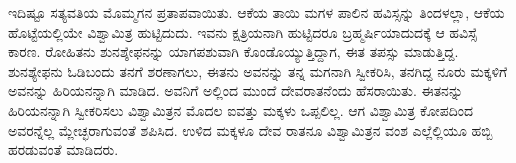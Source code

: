 ಇದಿಷ್ಟೂ ಸತ್ಯವತಿಯ ಮೊಮ್ಮಗನ ಪ್ರತಾಪವಾಯಿತು. ಆಕೆಯ ತಾಯಿ ಮಗಳ ಪಾಲಿನ ಹವಿಸ್ಸನ್ನು ತಿಂದಳಲ್ಲಾ, ಆಕೆಯ ಹೊಟ್ಟೆಯಲ್ಲಿಯೇ ವಿಶ್ವಾಮಿತ್ರ ಹುಟ್ಟಿದುದು. ಇವನು ಕ್ಷತ್ರಿಯನಾಗಿ ಹುಟ್ಟಿದರೂ ಬ್ರಹ್ಮರ್ಷಿಯಾದುದಕ್ಕೆ ಆ ಹವಿಸ್ಸೆ ಕಾರಣ. ರೋಹಿತನು ಶುನಶ್ಶೇಫನನ್ನು ಯಾಗಪಶುವಾಗಿ ಕೊಂಡೊಯ್ಯುತ್ತಿದ್ದಾಗ, ಈತ ತಪಸ್ಸು ಮಾಡುತ್ತಿದ್ದ. ಶುನಶ್ಯೇಫನು ಓಡಿಬಂದು ತನಗೆ ಶರಣಾಗಲು, ಈತನು ಅವನನ್ನು ತನ್ನ ಮಗನಾಗಿ ಸ್ವೀಕರಿಸಿ, ತನಗಿದ್ದ ನೂರು ಮಕ್ಕಳಿಗೆ ಅವನನ್ನು ಹಿರಿಯನನ್ನಾಗಿ ಮಾಡಿದ. ಅವನಿಗೆ ಅಲ್ಲಿಂದ ಮುಂದೆ ದೇವರಾತನೆಂದು ಹೆಸರಾಯಿತು. ಈತನನ್ನು ಹಿರಿಯನನ್ನಾಗಿ ಸ್ವೀಕರಿಸಲು ವಿಶ್ವಾಮಿತ್ರನ ಮೊದಲ ಐವತ್ತು ಮಕ್ಕಳು ಒಪ್ಪಲಿಲ್ಲ. ಆಗ ವಿಶ್ವಾಮಿತ್ರ ಕೋಪದಿಂದ ಅವರನ್ನೆಲ್ಲ ಮ್ಲೇಚ್ಛರಾಗುವಂತೆ ಶಪಿಸಿದ. ಉಳಿದ ಮಕ್ಕಳೂ ದೇವ ರಾತನೂ ವಿಶ್ವಾಮಿತ್ರನ ವಂಶ ಎಲ್ಲೆಲ್ಲಿಯೂ ಹಬ್ಬಿ ಹರಡುವಂತೆ ಮಾಡಿದರು.

